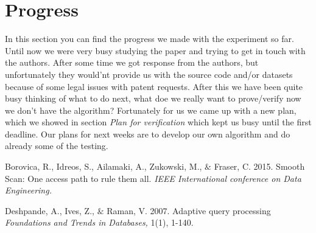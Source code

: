 \documentclass[a4paper,11pt,titlepage]{article}
\begin{document}
\section{Progress}
In this section you can find the progress we made with the experiment so far. Until now we were very busy studying the paper and trying to get in touch with the authors. After some time we got response from the authors, but unfortunately they would'nt provide us with the source code and/or datasets because of some legal issues with patent requests. After this we have been quite busy thinking of what to do next, what doe we really want to prove/verify now we don't have the algorithm? Fortunately for us we came up with a new plan, which we showed in section \emph{Plan for verification} which kept us busy until the first deadline. Our plans for next weeks are to develop our own algorithm and do already some of the testing.
\begin{thebibliography}{9}

	 Borovica, R., Idreos, S., Ailamaki, A., Zukowski, M., $\&$ Fraser, C.
	2015.	
 	Smooth Scan: One access path to rule them all.
	\emph{IEEE International conference on Data Engineering.}

	Deshpande, A., Ives, Z., $\&$ Raman, V.
	2007.
	Adaptive query processing
	\emph{Foundations and Trends in Databases,}
	1(1), 1-140.
\end{thebibliography}
\end{document}
